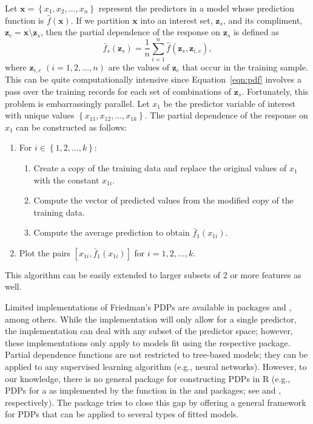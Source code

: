Let $\boldsymbol{x} = \left\{x_1, x_2, \dots, x_n\right\}$ represent the predictors in a model whose prediction function is $\widehat{f}\left(\boldsymbol{x}\right)$. If we partition $\boldsymbol{x}$ into an interest set, $\boldsymbol{z}_s$, and its compliment, $\boldsymbol{z}_{c} = \boldsymbol{x} \setminus \boldsymbol{z}_s$, then the partial dependence of the response on $\boldsymbol{z}_s$ is defined as
\begin{equation}
\label{eqn:pdf}
\bar{f}_s\left(\boldsymbol{z}_s\right) = \frac{1}{n}\sum_{i = 1}^n\widehat{f}\left(\boldsymbol{z}_s,\boldsymbol{z}_{i, c}\right),
\end{equation}
where $\boldsymbol{z}_{i, c}$ $\left(i = 1, 2, \dots, n\right)$ are the values of $\boldsymbol{z}_c$ that occur in the training sample. This can be quite computationally intensive since Equation~\eqref{eqn:pdf} involves a pass over the training records for each set of combinations of $\boldsymbol{z}_s$. Fortunately, this problem is embarrassingly parallel. Let $x_1$ be the predictor variable of interest with unique values $\left\{x_{11}, x_{12}, \dots, x_{1k}\right\}$. The partial dependence of the response on $x_1$ can be constructed as follows:
\begin{enumerate}
  \item For $i \in \left\{1, 2, \dots, k\right\}$:
  \begin{enumerate}
    \item Create a copy of the training data and replace the original values of $x_1$ with the constant $x_{1i}$.
    \item Compute the vector of predicted values from the modified copy of the training data.
    \item Compute the average prediction to obtain $\bar{f}_1\left(x_{1i}\right)$.
  \end{enumerate}
  \item Plot the pairs $\left[x_{1i}, \bar{f}_1\left(x_{1i}\right)\right]$ for $i = 1, 2, \dotsc, k$.
\end{enumerate}
This algorithm can be easily extended to larger subsets of 2 or more features as well.

Limited implementations of Friedman's PDPs are available in packages  \citep{randomForest-pkg} and , among others. While the  implementation will only allow for a single predictor, the  implementation can deal with any subset of the predictor space; however, these implementations only apply to models fit using the respective package. Partial dependence functions are not restricted to tree-based models; they can be applied to any supervised learning algorithm (e.g., neural networks). However, to our knowledge, there is no general package for constructing PDPs  in R (e.g., PDPs for a  as implemented by the  function in the  and  packages; see \citet{party-pkg} and \citet{partykit-pkg}, respectively). The  \citep{partial-pkg} package tries to close this gap by offering a general framework for PDPs that can be applied to several types of fitted models.

